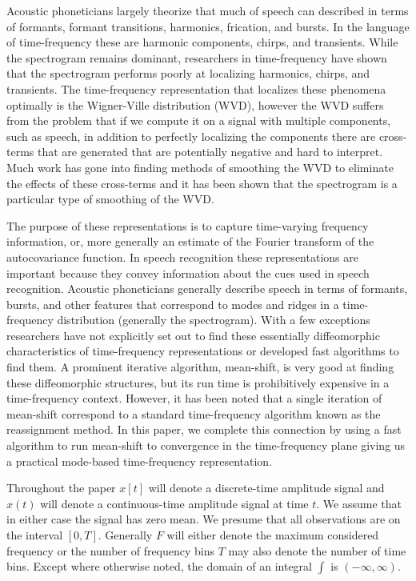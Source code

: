 \documentclass[english]{article}
\begin{document}
Acoustic phoneticians largely theorize that much of speech can described in
terms of formants, formant transitions, harmonics, frication,
and bursts.  In the language of time-frequency these are harmonic components,
chirps, and transients.  While the spectrogram remains dominant, researchers in
time-frequency have shown that the spectrogram performs poorly at localizing
harmonics, chirps, and transients.  The time-frequency representation that
localizes these phenomena optimally is the Wigner-Ville distribution (WVD), however
the WVD suffers from the problem that if we compute it on a signal with multiple
components, such as speech, in addition to perfectly localizing the components
there are cross-terms that are generated that are potentially negative and hard
to interpret.  Much work has gone into finding methods of smoothing the WVD
to eliminate the effects of these cross-terms and it has been shown that the 
spectrogram is a particular type of smoothing of the WVD.



  The purpose of these representations is to capture
time-varying frequency information, or, more generally an estimate
of the Fourier transform of the
autocovariance function.  In speech recognition these representations are important
because they convey information about the cues used in speech recognition.  
Acoustic phoneticians \cite{stevens98} generally describe speech in terms
of formants, bursts, and other features that correspond to modes and ridges in
a time-frequency distribution (generally the spectrogram). With a few exceptions
researchers have not explicitly set out to find these essentially diffeomorphic
characteristics of time-frequency representations or developed fast algorithms to
find them.  A prominent iterative algorithm, mean-shift, is very good at finding these
diffeomorphic structures, but its run time is prohibitively expensive in
a time-frequency context.  However, it has been noted that a single iteration of mean-shift
correspond to a standard time-frequency algorithm known as the reassignment method.
In this paper, we complete this connection by using a fast algorithm to run mean-shift
to convergence in the time-frequency plane giving us a practical mode-based time-frequency
representation.

Throughout the paper $x[t]$ will denote a discrete-time amplitude signal and $x(t)$ will denote
a continuous-time amplitude signal at time $t$. We assume that in either case the signal has zero mean.
 We presume that all observations are on the interval $[0,T]$.
Generally $F$ will either denote the maximum considered frequency or the number of frequency bins $T$ may
also denote the number of time bins. Except where otherwise noted, the domain of an integral $\int$ is $(-\infty,\infty)$.
\end{document}
